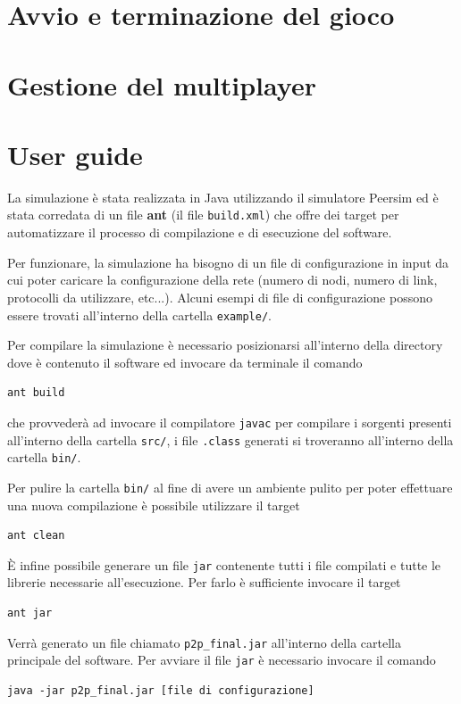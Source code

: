 \documentclass[a4paper,12pt]{article}
\begin{document}
\section{Avvio e terminazione del gioco}
\label{sec:avvio}

\section{Gestione del multiplayer}
\label{sec:multiplayer}

\section{User guide}
\label{sec:guide}

La simulazione \`e stata realizzata in Java utilizzando il simulatore Peersim ed \`e stata corredata di un file \textbf{ant} (il file \texttt{build.xml}) che offre dei target per automatizzare il processo di compilazione e di esecuzione del software.

Per funzionare, la simulazione ha bisogno di un file di configurazione in input da cui poter caricare la configurazione della rete (numero di nodi, numero di link, protocolli da utilizzare, etc...). Alcuni esempi di file di configurazione possono essere trovati all'interno della cartella \texttt{example/}.

Per compilare la simulazione \`e necessario posizionarsi all'interno della directory dove \`e contenuto il software ed invocare da terminale il comando

\begin{lstlisting}[basicstyle=\ttfamily]
ant build
\end{lstlisting}

che provveder\`a ad invocare il compilatore \texttt{javac} per compilare i sorgenti presenti all'interno della cartella \texttt{src/}, i file \texttt{.class} generati si troveranno all'interno della cartella \texttt{bin/}. 

Per pulire la cartella \texttt{bin/} al fine di avere un ambiente pulito per poter effettuare una nuova compilazione \`e possibile utilizzare il target
\begin{lstlisting}[basicstyle=\ttfamily]
ant clean
\end{lstlisting}

\`E infine possibile generare un file \texttt{jar} contenente tutti i file compilati e tutte le librerie necessarie all'esecuzione. Per farlo \`e sufficiente invocare il target
\begin{lstlisting}[basicstyle=\ttfamily]
ant jar
\end{lstlisting}
Verr\`a generato un file chiamato \texttt{p2p\_final.jar} all'interno della cartella principale del software.
Per avviare il file \texttt{jar} \`e necessario invocare il comando
\begin{lstlisting}[basicstyle=\ttfamily]
java -jar p2p_final.jar [file di configurazione]
\end{lstlisting}
\end{document}
